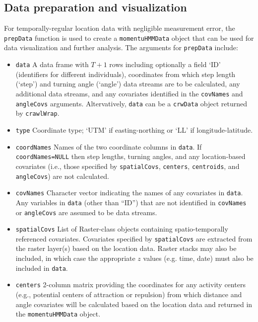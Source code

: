 \documentclass[12pt]{article}\usepackage[]{graphicx}\usepackage[]{xcolor}
\begin{document}
\begin{small}
\begin{table}
{}
\end{table}
\end{small}



\subsection{Data preparation and visualization}
For temporally-regular location data with negligible measurement error, the \verb|prepData| function is used to create a \verb|momentuHMMData| object that can be used for data visualization and further analysis. The arguments for \verb|prepData| include:
\begin{itemize}
  \item{\verb|data|} A data frame with $T+1$ rows including optionally a field `ID' (identifiers for different individuals), coordinates from which step length (`step') and turning angle (`angle') data streams are to be calculated, any additional data streams, and any covariates identified in the \verb|covNames| and \verb|angleCovs| arguments. Altervatively, \verb|data| can be a \verb|crwData| object returned by \verb|crawlWrap|.
  \item{\verb|type|} Coordinate type; `UTM' if easting-northing or `LL' if longitude-latitude.
  \item{\verb|coordNames|} Names of the two coordinate columns in \verb|data|. If \verb|coordNames=NULL| then step lengths, turning angles, and any location-based covariates (i.e., those specified by \verb|spatialCovs|, \verb|centers|, \verb|centroids|, and \verb|angleCovs|) are not calculated.
  \item{\verb|covNames|} Character vector indicating the names of any covariates in \verb|data|. Any variables in \verb|data| (other than ``ID'') that are not identified in \verb|covNames| or \verb|angleCovs| are assumed to be data streams.
  \item{\verb|spatialCovs|} List of Raster-class objects \citep{Hijmans2016} containing spatio-temporally referenced covariates. Covariates specified by \verb|spatialCovs| are extracted from the raster layer(s) based on the location data. Raster stacks may also be included, in which case the appropriate $z$ values (e.g. time, date) must also be included in \verb|data|.
  \item{\verb|centers|} 2-column matrix providing the coordinates for any activity centers (e.g., potential centers of attraction or repulsion) from which distance and angle covariates will be calculated based on the location data and returned in the \verb|momentuHMMData| object.

\end{itemize}
\end{document}
